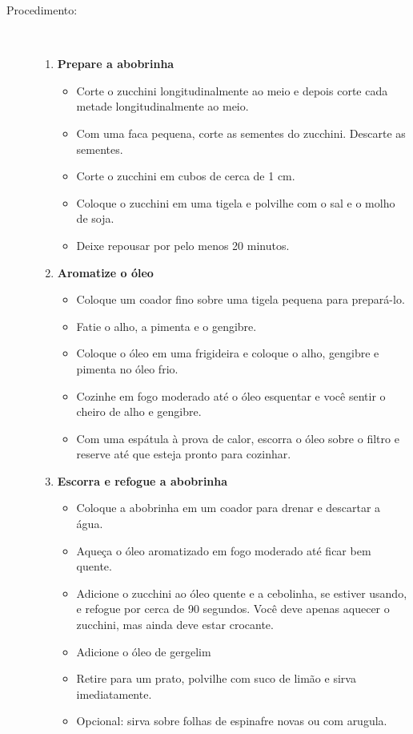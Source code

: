 \documentclass[11pt,letterpaper]{article}
\newcommand \fileName {AsianZucchini}
\begin{document}
\begin {description}
\item [Procedimento:] \ \\
\begin {enumerate}
\item {\bf Prepare a abobrinha}
\begin {itemize}
\item Corte o zucchini longitudinalmente ao meio e depois corte cada metade longitudinalmente ao meio.
\item Com uma faca pequena, corte as sementes do zucchini. Descarte as sementes.
\item Corte o zucchini em cubos de cerca de 1 cm.
\item Coloque o zucchini em uma tigela e polvilhe com o sal e o molho de soja.
\item Deixe repousar por pelo menos 20 minutos.
\end {itemize}
\item {\bf Aromatize o óleo}
\begin {itemize}
        \item Coloque um coador fino sobre uma tigela pequena para prepará-lo.
\item Fatie o alho, a pimenta e o gengibre.
\item Coloque o óleo em uma frigideira e coloque o alho, gengibre e pimenta no óleo frio.
\item Cozinhe em fogo moderado até o óleo esquentar e você sentir o cheiro de alho e gengibre.
\item Com uma espátula à prova de calor, escorra o óleo sobre o filtro e reserve até que esteja pronto para cozinhar.
\end {itemize}
\item {\bf Escorra e refogue a abobrinha}
\begin {itemize}
\item Coloque a abobrinha em um coador para drenar e descartar a água.
\item Aqueça o óleo aromatizado em fogo moderado até ficar bem quente.
\item Adicione o zucchini ao óleo quente e a cebolinha, se estiver usando, e refogue por cerca de 90 segundos. Você deve apenas aquecer o zucchini, mas ainda deve estar crocante.
\item Adicione o óleo de gergelim
\item Retire para um prato, polvilhe com suco de limão e sirva imediatamente.
\item Opcional: sirva sobre folhas de espinafre novas ou com arugula.
	\end{itemize}
	\end{enumerate}
\end{description}

\end{document}
